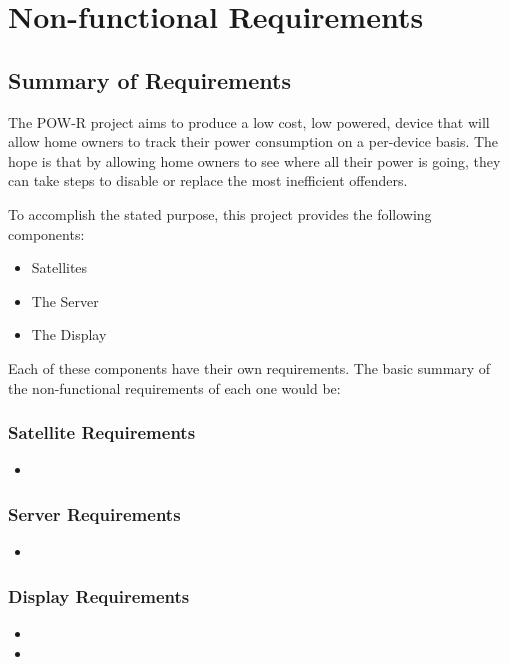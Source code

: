 \chapter{Non-functional Requirements}

\section{Summary of Requirements}
The POW-R project aims to produce a low cost, low powered, device that will allow home owners to track their power consumption on a per-device basis. 
The hope is that by allowing home owners to see where all their power is going, they can take steps to disable or replace the most inefficient offenders.

To accomplish the stated purpose, this project provides the following components:
\begin{itemize}
 \item Satellites
 \item The Server
 \item The Display
\end{itemize}

Each of these components have their own requirements. The basic summary of the non-functional requirements of each one would be:

\subsection{Satellite Requirements}
\begin{itemize}
  \item
\end{itemize}

\subsection{Server Requirements}
\begin{itemize}
  \item 
\end{itemize}

\subsection{Display Requirements}
\begin{itemize}
  \item 
  \item
\end{itemize}
